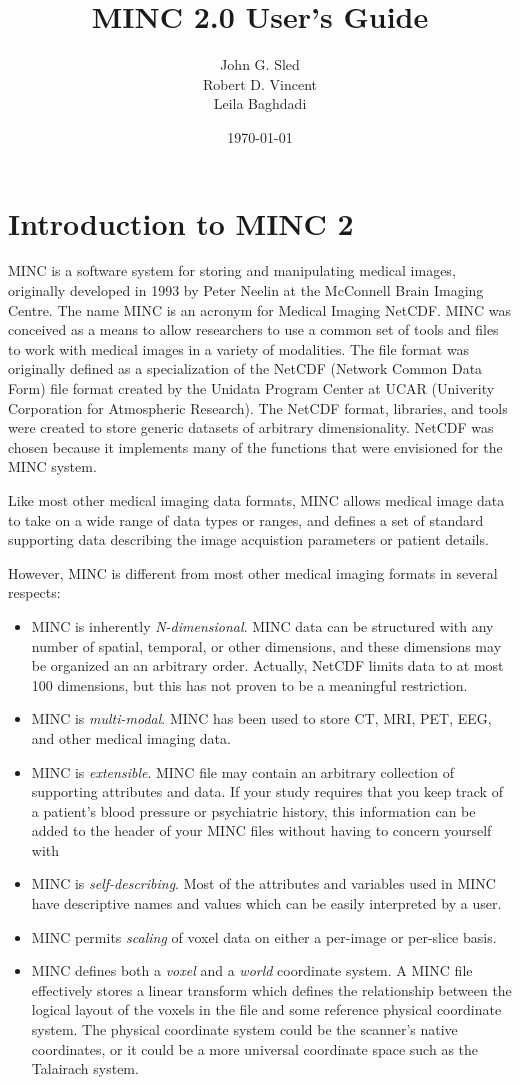 \documentclass{article}
\title{MINC 2.0 User's Guide}
\author{John G. Sled \\
Robert D. Vincent \\
Leila Baghdadi}
\date{\today}
\begin{document}
\maketitle
\newpage
\tableofcontents
\newpage
\section{Introduction to MINC 2}
MINC is a software system for storing and manipulating medical images,
originally developed in 1993 by Peter Neelin at the McConnell Brain
Imaging Centre.  The name MINC is an acronym for Medical Imaging
NetCDF.  MINC was conceived as a means to allow researchers to use a
common set of tools and files to work with medical images in a variety
of modalities.  The file format was originally defined as a
specialization of the NetCDF (Network Common Data Form) file format
created by the Unidata Program Center at UCAR (Univerity Corporation
for Atmospheric Research).  The NetCDF format, libraries, and tools
were created to store generic datasets of arbitrary dimensionality.
NetCDF was chosen because it implements many of the functions that
were envisioned for the MINC system.

Like most other medical imaging data formats, MINC allows medical
image data to take on a wide range of data types or ranges, and
defines a set of standard supporting data describing the image
acquistion parameters or patient details.

However, MINC is different from most other medical imaging formats in
several respects:
\begin{itemize}
\item MINC is inherently {\it N-dimensional}.  MINC data can be
structured with any number of spatial, temporal, or other dimensions,
and these dimensions may be organized an an arbitrary order.
Actually, NetCDF limits data to at most 100 dimensions, but
this has not proven to be a meaningful restriction.
\item MINC is {\it multi-modal}.  MINC has been used to store CT, MRI,
PET, EEG, and other medical imaging data.
\item MINC is {\it extensible}.  MINC file may contain an arbitrary
collection of supporting attributes and data.  If your study requires
that you keep track of a patient's blood pressure or psychiatric
history, this information can be added to the header of your MINC
files without having to concern yourself with
\item MINC is {\it self-describing}.  Most of the attributes and
variables used in MINC have descriptive names and values which can be
easily interpreted by a user.
\item MINC permits {\it scaling} of voxel data on either a per-image or
per-slice basis.
\item MINC defines both a {\it voxel} and a {\it world} coordinate system.  
A MINC file effectively stores a linear transform which defines the 
relationship between the logical layout of the voxels in the file and 
some reference physical coordinate system.  The physical coordinate
system could be the scanner's native coordinates, or it could be a
more universal coordinate space such as the Talairach system.
\end{itemize}
\end{document}
